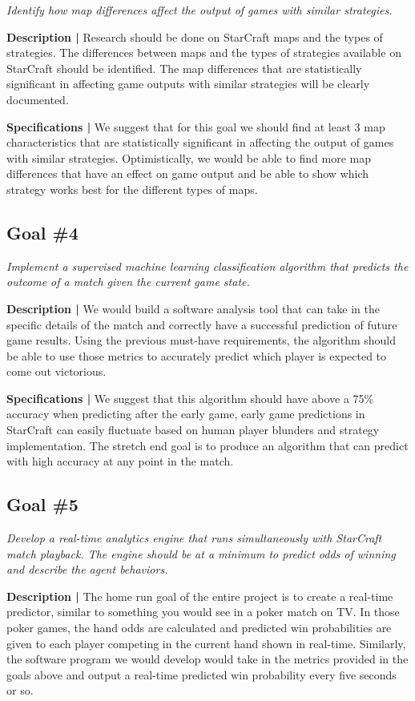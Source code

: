 \documentclass[a4paper,12pt]{report}
\begin{document}
\textit{Identify how map differences affect the output of games with similar strategies.}

\textbf{Description |} Research should be done on StarCraft maps and the types of strategies. The differences between maps and the types of strategies available on StarCraft should be identified. The map differences that are statistically significant in affecting game outputs with similar strategies will be clearly documented.

\textbf{Specifications |} We suggest that for this goal we should find at least 3 map characteristics that are statistically significant in affecting the output of games with similar strategies. Optimistically, we would be able to find more map differences that have an effect on game output and be able to show which strategy works best for the different types of maps.

\subsection{Goal \#4}

\textit{Implement a supervised machine learning classification algorithm that predicts the outcome of a match given the current game state.}

\textbf{Description |} We would build a software analysis tool that can take in the specific details of the match and correctly have a successful prediction of future game results. Using the previous must-have requirements, the algorithm should be able to use those metrics to accurately predict which player is expected to come out victorious.

\textbf{Specifications |} We suggest that this algorithm should have above a 75\% accuracy when predicting after the early game, early game predictions in StarCraft can easily fluctuate based on human player blunders and strategy implementation. The stretch end goal is to produce an algorithm that can predict with high accuracy at any point in the match.

\subsection{Goal \#5}

\textit{Develop a real-time analytics engine that runs simultaneously with StarCraft match playback. The engine should be at a minimum to predict odds of winning and describe the agent behaviors.}

\textbf{Description |} The home run goal of the entire project is to create a real-time predictor, similar to something you would see in a poker match on TV. In those poker games, the hand odds are calculated and predicted win probabilities are given to each player competing in the current hand shown in real-time. Similarly, the software program we would develop would take in the metrics provided in the goals above and output a real-time predicted win probability every five seconds or so.
\end{document}
